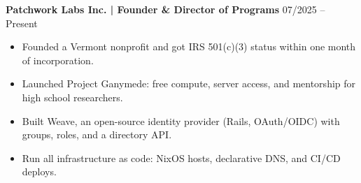 \noindent
\textbf{Patchwork Labs Inc. | Founder \& Director of Programs} \hfill 07/2025 -- Present
\begin{itemize}
    \item Founded a Vermont nonprofit and got IRS 501(c)(3) status within one month of incorporation.
    \item Launched Project Ganymede: free compute, server access, and mentorship for high school researchers.
    \item Built Weave, an open-source identity provider (Rails, OAuth/OIDC) with groups, roles, and a directory API.
    \item Run all infrastructure as code: NixOS hosts, declarative DNS, and CI/CD deploys.
\end{itemize}

